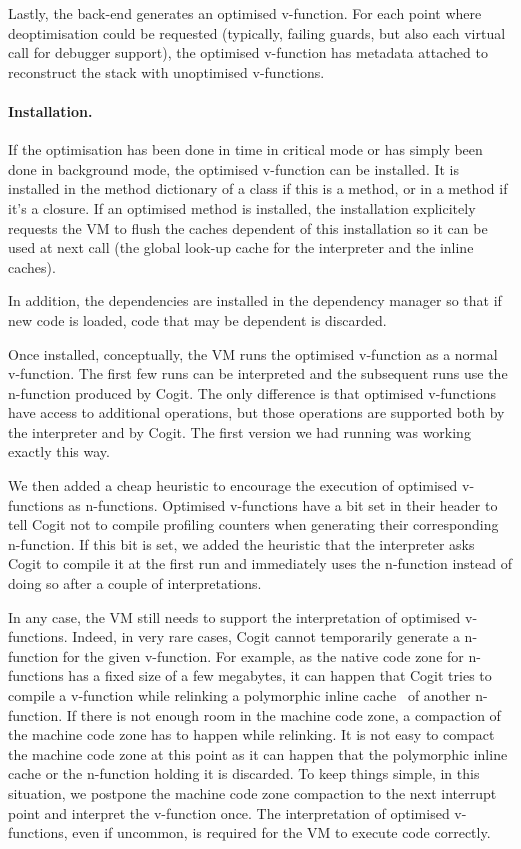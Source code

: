 \documentclass[a4paper,12pt,twoside]{../includes/ThesisStyle}
\begin{document}
Lastly, the back-end generates an optimised v-function. For each point where deoptimisation could be requested (typically, failing guards, but also each virtual call for debugger support), the optimised v-function has metadata attached to reconstruct the stack with unoptimised v-functions.

\paragraph{Installation.}
If the optimisation has been done in time in critical mode or has simply been done in background mode, the optimised v-function can be installed. It is installed in the method dictionary of a class if this is a method, or in a method if it's a closure. If an optimised method is installed, the installation explicitely requests the VM to flush the caches dependent of this installation so it can be used at next call (the global look-up cache for the interpreter and the inline caches).

In addition, the dependencies are installed in the dependency manager so that if new code is loaded, code that may be dependent is discarded.

Once installed, conceptually, the VM runs the optimised v-function as a normal v-function. The first few runs can be interpreted and the subsequent runs use the n-function produced by Cogit. The only difference is that optimised v-functions have access to additional operations, but those operations are supported both by the interpreter and by Cogit. The first version we had running was working exactly this way.

We then added a cheap heuristic to encourage the execution of optimised v-functions as n-functions. Optimised v-functions have a bit set in their header to tell Cogit not to compile profiling counters when generating their corresponding n-function. If this bit is set, we added the heuristic that the interpreter asks Cogit to compile it at the first run and immediately uses the n-function instead of doing so after a couple of interpretations.

In any case, the VM still needs to support the interpretation of optimised v-functions. Indeed, in very rare cases, Cogit cannot temporarily generate a n-function for the given v-function. For example, as the native code zone for n-functions has a fixed size of a few megabytes, it can happen that Cogit tries to compile a v-function while relinking a polymorphic inline cache~\cite{Holz91a} of another n-function. If there is not enough room in the machine code zone, a compaction of the machine code zone has to happen while relinking. It is not easy to compact the machine code zone at this point as it can happen that the polymorphic inline cache or the n-function holding it is discarded. To keep things simple, in this situation, we postpone the machine code zone compaction to the next interrupt point and interpret the v-function once. The interpretation of optimised v-functions, even if uncommon, is required for the VM to execute code correctly.  
\end{document}
